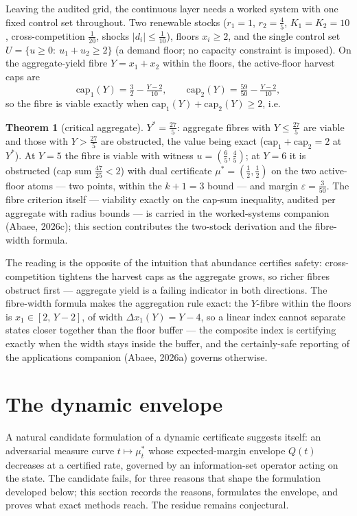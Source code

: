 \documentclass[10pt,twocolumn]{article}
\theoremstyle{definition}
\newtheorem{theorem}{Theorem}
\begin{document}
Leaving the audited grid, the continuous layer needs a worked system with
one fixed control set throughout. Two renewable stocks
($r_{1} = 1$, $r_{2} = \tfrac45$, $K_{1} = K_{2} = 10$, cross-competition
$\tfrac1{20}$, shocks $|d_{i}| \le \tfrac1{10}$), floors
$x_{i} \ge 2$, and the single control set
$U = \{u \ge 0:\ u_{1} + u_{2} \ge 2\}$ (a demand floor; no capacity
constraint is imposed). On the aggregate-yield fibre
$Y = x_{1} + x_{2}$ within the floors, the active-floor harvest caps are
\[
\mathrm{cap}_{1}(Y) = \tfrac32 - \tfrac{Y-2}{10},\qquad
\mathrm{cap}_{2}(Y) = \tfrac{59}{50} - \tfrac{Y-2}{10},
\]
so the fibre is viable exactly when
$\mathrm{cap}_{1}(Y) + \mathrm{cap}_{2}(Y) \ge 2$, i.e.
\begin{theorem}[critical aggregate]\label{thm:benchmark}
$Y^{*} = \tfrac{27}{5}$: aggregate fibres with $Y \le \tfrac{27}{5}$ are
viable and those with $Y > \tfrac{27}{5}$ are obstructed, the value being
exact ($\mathrm{cap}_{1} + \mathrm{cap}_{2} = 2$ at $Y^{*}$). At
$Y = 5$ the fibre is viable with witness $u = (\tfrac65,\tfrac45)$; at
$Y = 6$ it is obstructed (cap sum $\tfrac{47}{25} < 2$) with dual
certificate $\mu^{*} = (\tfrac12,\tfrac12)$ on the two active-floor
atoms --- two points, within the $k+1 = 3$ bound --- and margin
$\varepsilon = \tfrac{3}{50}$. The fibre criterion itself --- viability
exactly on the cap-sum inequality, audited per aggregate with radius
bounds --- is carried in the worked-systems companion (Abaee, 2026c);
this section contributes the two-stock derivation and the fibre-width
formula.
\end{theorem}
The reading is the opposite of the intuition that abundance certifies
safety: cross-competition tightens the harvest caps as the aggregate
grows, so richer fibres obstruct first --- aggregate yield is a failing
indicator in both directions. The fibre-width formula makes the
aggregation rule exact: the $Y$-fibre within the floors is
$x_{1} \in [2,\,Y-2]$, of width $\Delta x_{1}(Y) = Y - 4$, so a linear
index cannot separate states closer together than the floor buffer ---
the composite index is certifying exactly when the width stays inside the
buffer, and the certainly-safe reporting of the applications companion
(Abaee, 2026a) governs otherwise.

\section{The dynamic envelope}

A natural candidate formulation of a dynamic certificate suggests itself: an adversarial measure curve $t \mapsto \mu^{*}_{t}$ whose expected-margin envelope $Q(t)$ decreases at a certified rate, governed by an information-set operator acting on the state. The candidate fails, for three reasons that shape the formulation developed below; this section records the reasons, formulates the envelope, and proves what exact methods reach. The residue remains conjectural.
\end{document}
